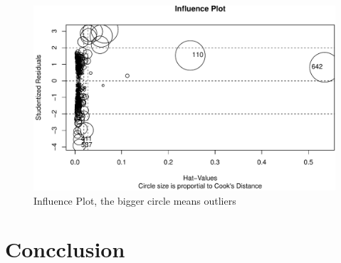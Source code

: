 \documentclass[11pt,a4paper,]{article}
\begin{document}
\begin{figure}
\centering
\includegraphics{Assignment4_files/figure-latex/inf-1.pdf}
\caption{\label{fig:inf}Influence Plot, the bigger circle means outliers}
\end{figure}

\clearpage

\hypertarget{concclusion}{%
\section{Concclusion}\label{concclusion}}

\clearpage

\printbibliography[title=Appendix]
\end{document}
